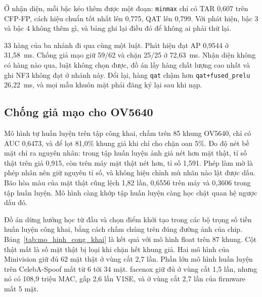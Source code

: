 \documentclass[../DoAn.tex]{subfiles}
\begin{document}
Ở nhận diện, mỗi bậc kéo thêm được một đoạn: \texttt{minmax} chỉ có TAR 0,607 trên CFP-FP, cách hiệu chuẩn tốt nhất lên 0,775, QAT lên 0,799. Với
phát hiện, bậc 3 và bậc 4 không thêm gì, và bảng ghi lại điều đó để không ai phải thử lại.

33 hàng của ba nhánh đi qua cùng một luật. Phát hiện đạt AP 0,9544 ở 31,58~ms. Chống giả mạo giữ 59/62 và chặn 25/25 ở 72,63~ms. Nhận diện không có hàng nào qua,
luật không chọn được, đồ án lấy hàng chất lượng cao nhất và ghi NF3 không đạt ở nhánh này. Đổi lại, hàng \texttt{qat} chậm hơn \texttt{qat+fused\_prelu} 26,22~ms,
và mọi mẫu khuôn mặt phải đăng ký lại sau khi nạp.

\subsection{Chống giả mạo cho OV5640}
\label{section:5.8.3}

Mô hình tự huấn luyện trên tập công khai, chấm trên 85 khung OV5640, chỉ có AUC 0,6473, và để lọt 81,0\% khung giả khi chỉ cho chặn oan 5\%. Đo độ
nét bề mặt chỉ ra nguyên nhân: trong tập huấn luyện ảnh giả nét hơn mặt thật, tỉ số thật trên giả 0,915, còn trên máy mặt thật nét hơn, tỉ số 1,591. Phép làm mờ là
phép nhân nên giữ nguyên tỉ số, và không hiệu chỉnh mù nhãn nào lật được dấu. Bão hòa màu của mặt thật cũng lệch 1,82 lần, 0,6556 trên máy và 0,3606 trong tập huấn
luyện. Mô hình càng khớp tập huấn luyện càng học chặt quan hệ ngược dấu đó.

Đồ án dừng hướng học từ đầu và chọn điểm khởi tạo trong các bộ trọng số tiền huấn luyện công khai, bằng cách chấm chúng trên đúng đường ảnh của chip. Bảng~\ref{tab:mo_hinh_cong_khai} là kết quả với mô hình
float trên 87 khung. Cột thật mất là số mặt thật bị loại khi chặn hết khung giả. Hai mô hình của Minivision giữ đủ 62 mặt thật ở vùng cắt 2,7 lần. Phần lớn mô hình huấn
luyện trên CelebA-Spoof mất từ 6 tới 34 mặt. facenox giữ đủ ở vùng cắt 1,5 lần, nhưng nó có 108,9 triệu MAC, gấp 2,6 lần V1SE, và ở vùng cắt 2,7 lần của firmware mất
5 mặt.
\end{document}
